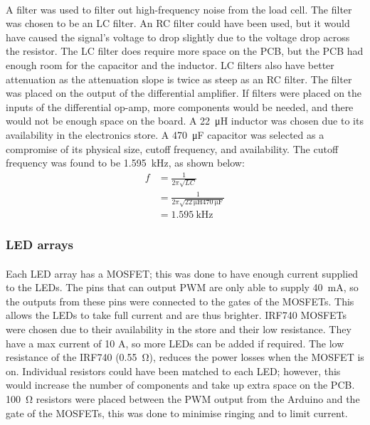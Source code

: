 \documentclass[twoside]{article}
\newcommand\ddfrac[2]{\frac{\displaystyle #1}{\displaystyle #2}}
\newcommand{\amp}{\ampere}
\begin{document}
        \paragraph{}
        A filter was used to filter out high-frequency noise from the load cell. The filter was chosen to be an LC filter. An RC filter could have been used, but it would have caused the signal's voltage to drop slightly due to the voltage drop across the resistor. The LC filter does require more space on the PCB, but the PCB had enough room for the capacitor and the inductor. LC filters also have better attenuation as the attenuation slope is twice as steep as an RC filter. The filter was placed on the output of the differential amplifier. If filters were placed on the inputs of the differential op-amp, more components would be needed, and there would not be enough space on the board. A \SI{22}{\micro\henry} inductor was chosen due to its availability in the electronics store. A \SI{470}{\micro\farad} capacitor was selected as a compromise of its physical size, cutoff frequency, and availability. The cutoff frequency was found to be \SI{1.595}{\kilo\hertz}, as shown below:
        \begin{align}
            f &= \ddfrac{1}{2 \pi \sqrt{L C}} \label{eq:f1}\\
            &= \ddfrac{1}{2 \pi \sqrt{\SI{22}{\micro\henry} \SI{470}{\micro\farad}}} \label{eq:f2}\\
            &= \SI{1.595}{\kilo\hertz} \label{eq:f3}
        \end{align}

        \subsubsection{LED arrays}
        \paragraph{}
        Each LED array has a MOSFET; this was done to have enough current supplied to the LEDs. The pins that can output PWM are only able to supply \SI{40}{\milli\amp}, so the outputs from these pins were connected to the gates of the MOSFETs. This allows the LEDs to take full current and are thus brighter. IRF740 MOSFETs were chosen due to their availability in the store and their low resistance. They have a max current of 10 A, so more LEDs can be added if required. The low resistance of the IRF740 (\SI{0.55}{\ohm}), reduces the power losses when the MOSFET is on. Individual resistors could have been matched to each LED; however, this would increase the number of components and take up extra space on the PCB. \SI{100}{\ohm} resistors were placed between the PWM output from the Arduino and the gate of the MOSFETs, this was done to minimise ringing and to limit current.
\end{document}
